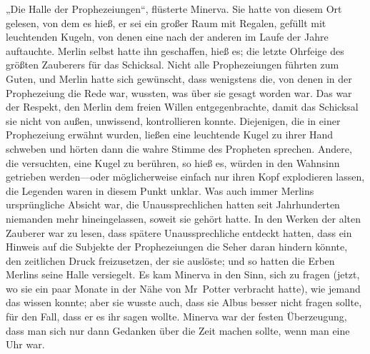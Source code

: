 „Die Halle der Prophezeiungen“, flüsterte Minerva. Sie hatte von diesem Ort gelesen, von dem es hieß, er sei ein großer Raum mit Regalen, gefüllt mit leuchtenden Kugeln, von denen eine nach der anderen im Laufe der Jahre auftauchte. Merlin selbst hatte ihn geschaffen, hieß es; die letzte Ohrfeige des größten Zauberers für das Schicksal. Nicht alle Prophezeiungen führten zum Guten, und Merlin hatte sich gewünscht, dass wenigstens die, von denen in der Prophezeiung die Rede war, wussten, was über sie gesagt worden war. Das war der Respekt, den Merlin dem freien Willen entgegenbrachte, damit das Schicksal sie nicht von außen, unwissend, kontrollieren konnte. Diejenigen, die in einer Prophezeiung erwähnt wurden, ließen eine leuchtende Kugel zu ihrer Hand schweben und hörten dann die wahre Stimme des Propheten sprechen. Andere, die versuchten, eine Kugel zu berühren, so hieß es, würden in den Wahnsinn getrieben werden—oder möglicherweise einfach nur ihren Kopf explodieren lassen, die Legenden waren in diesem Punkt unklar. Was auch immer Merlins ursprüngliche Absicht war, die Unaussprechlichen hatten seit Jahrhunderten niemanden mehr hineingelassen, soweit sie gehört hatte. In den Werken der alten Zauberer war zu lesen, dass spätere Unaussprechliche entdeckt hatten, dass ein Hinweis auf die Subjekte der Prophezeiungen die Seher daran hindern könnte, den zeitlichen Druck freizusetzen, der sie auslöste; und so hatten die Erben Merlins seine Halle versiegelt. Es kam Minerva in den Sinn, sich zu fragen (jetzt, wo sie ein paar Monate in der Nähe von Mr~Potter verbracht hatte), wie jemand das wissen konnte; aber sie wusste auch, dass sie Albus besser nicht fragen sollte, für den Fall, dass er es ihr sagen wollte. Minerva war der festen Überzeugung, dass man sich nur dann Gedanken über die Zeit machen sollte, wenn man eine Uhr war.

